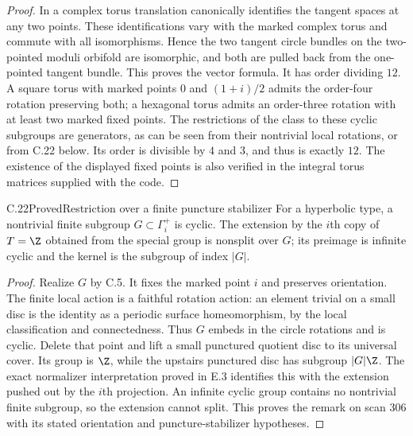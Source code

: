 \begin{proof}
In a complex torus translation canonically identifies the tangent
spaces at any two points. These identifications vary with the marked
complex torus and commute with all isomorphisms. Hence the two tangent
circle bundles on the two-pointed moduli orbifold are isomorphic, and
both are pulled back from the one-pointed tangent bundle. This proves
the vector formula. It has order dividing $12$. A square torus with
marked points $0$ and $(1+i)/2$ admits the order-four rotation preserving
both; a hexagonal torus admits an order-three rotation with at least
two marked fixed points. The restrictions of the class to these cyclic
subgroups are generators, as can be seen from their nontrivial local
rotations, or from C.22 below. Its order is divisible by $4$ and $3$,
and thus is exactly $12$. The existence of the displayed fixed points
is also verified in the integral torus matrices supplied with the code.
\end{proof}

\begin{claim}{C.22}{Proved}{Restriction over a finite puncture stabilizer}
For a hyperbolic type, a nontrivial finite subgroup
$G\subset\Gamma_i^+$ is cyclic. The extension by the $i$th copy of
$T=\Z$ obtained from the special group is nonsplit over $G$; its
preimage is infinite cyclic and the kernel is the subgroup of index
$|G|$.
\end{claim}
\begin{proof}
Realize $G$ by C.5. It fixes the marked point $i$ and preserves
orientation. The finite local action is a faithful rotation action:
an element trivial on a small disc is the identity as a periodic
surface homeomorphism, by the local classification and connectedness.
Thus $G$ embeds in the circle rotations and is cyclic. Delete that
point and lift a small punctured quotient disc to its universal cover.
Its group is $\Z$, while the upstairs punctured disc has subgroup
$|G|\Z$. The exact normalizer interpretation proved in E.3 identifies
this with the extension pushed out by the $i$th projection. An infinite
cyclic group contains no nontrivial finite subgroup, so the extension
cannot split. This proves the remark on scan 306 with its stated
orientation and puncture-stabilizer hypotheses.
\end{proof}



